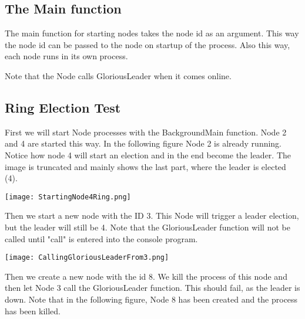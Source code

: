 \subsection{The Main function}
The main function for starting nodes takes the node id as an argument. This way the node id can be passed to the node on startup of the process. Also this way, each node runs in its own process.

\begin{center}
\end{center}

Note that the Node calls GloriousLeader when it comes online. 

\subsection{Ring Election Test}
First we will start Node processes with the BackgroundMain function. Node 2 and 4 are started this way. In the following figure Node 2 is already running. Notice how node 4 will start an election and in the end become the leader. The image is truncated and mainly shows the last part, where the leader is elected (4).

\begin{center}
	\texttt{[image: StartingNode4Ring.png]}
\end{center}

Then we start a new node with the ID 3. This Node will trigger a leader election, but the leader will still be 4.
Note that the GloriousLeader function will not be called until "call" is entered into the console program. 

\begin{center}
	\texttt{[image: CallingGloriousLeaderFrom3.png]}
\end{center}

Then we create a new node with the id 8. We kill the process of this node and then let Node 3 call the GloriousLeader function. This should fail, as the leader is down. Note that in the following figure, Node 8 has been created and the process has been killed.

